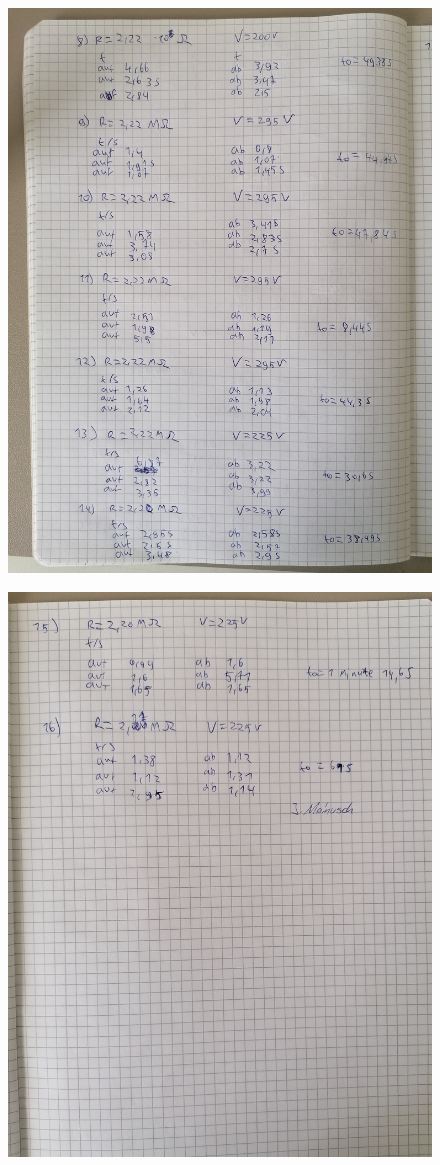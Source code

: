\begin{figure}
    \centering
    \includegraphics[width=\textwidth]{content/Anhang 2.jpg}
\end{figure}
    
\begin{figure}
    \centering
    \includegraphics[width=\textwidth]{content/Anhang 3.jpg}
\end{figure}
    